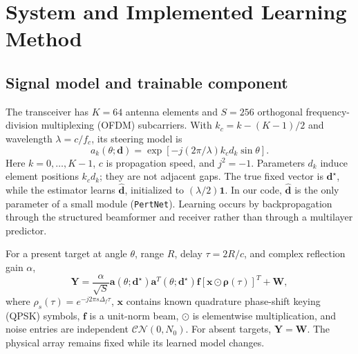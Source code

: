 \documentclass[conference]{IEEEtran}
\begin{document}
\section{System and Implemented Learning Method}
\subsection{Signal model and trainable component}
The transceiver has $K=64$ antenna elements and $S=256$ orthogonal frequency-division multiplexing (OFDM) subcarriers. With $k_c=k-(K-1)/2$ and wavelength $\lambda=c/f_c$, its steering model is
\begin{equation}
 a_k(\theta;\mathbf d)=\exp[-j(2\pi/\lambda)k_c d_k\sin\theta].
 \label{eq:steer}
\end{equation}
Here $k=0,\ldots,K-1$, $c$ is propagation speed, and $j^2=-1$. Parameters $d_k$ induce element positions $k_cd_k$; they are not adjacent gaps. The true fixed vector is $\mathbf d^\star$, while the estimator learns $\widehat{\mathbf d}$, initialized to $(\lambda/2)\mathbf1$. In our code, $\widehat{\mathbf d}$ is the only parameter of a small module (\texttt{PertNet}). Learning occurs by backpropagation through the structured beamformer and receiver rather than through a multilayer predictor.

For a present target at angle $\theta$, range $R$, delay $\tau=2R/c$, and complex reflection gain $\alpha$,
\begin{equation}
 \mathbf Y=\frac{\alpha}{\sqrt S}\mathbf a(\theta;\mathbf d^\star)
 \mathbf a^T(\theta;\mathbf d^\star)\mathbf f
 [\mathbf x\odot\bm\rho(\tau)]^T+\mathbf W,
 \label{eq:obs}
\end{equation}
where $\rho_s(\tau)=e^{-j2\pi s\Delta_f\tau}$, $\mathbf x$ contains known quadrature phase-shift keying (QPSK) symbols, $\mathbf f$ is a unit-norm beam, $\odot$ is elementwise multiplication, and noise entries are independent $\mathcal{CN}(0,N_0)$. For absent targets, $\mathbf Y=\mathbf W$. The physical array remains fixed while its learned model changes.
\end{document}
